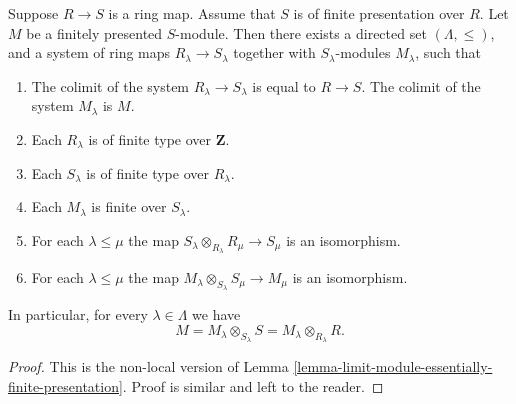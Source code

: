 \begin{lemma}
\label{lemma-limit-module-finite-presentation}
Suppose $R \to S$ is a ring map.
Assume that $S$ is of finite presentation over $R$.
Let $M$ be a finitely presented $S$-module.
Then there exists a directed set $(\Lambda, \leq)$, and
a system of ring maps $R_\lambda \to S_\lambda$
together with $S_\lambda$-modules $M_\lambda$,
such that
\begin{enumerate}
\item The colimit of the system $R_\lambda \to S_\lambda$
is equal to $R \to S$. The colimit of the system $M_\lambda$
is $M$.
\item Each $R_\lambda$ is of finite type
over $\mathbf{Z}$.
\item Each $S_\lambda$ is of finite type
over $R_\lambda$.
\item Each $M_\lambda$ is finite over $S_\lambda$.
\item For each $\lambda \leq \mu$ the map
$S_\lambda \otimes_{R_\lambda} R_\mu \to S_\mu$
is an isomorphism.
\item For each $\lambda \leq \mu$ the map
$M_\lambda \otimes_{S_\lambda} S_\mu \to M_\mu$
is an isomorphism.
\end{enumerate}
In particular, for every $\lambda \in \Lambda$ we have
$$
M = M_\lambda \otimes_{S_\lambda} S
= M_\lambda \otimes_{R_\lambda} R.
$$
\end{lemma}

\begin{proof}
This is the non-local version of
Lemma \ref{lemma-limit-module-essentially-finite-presentation}.
Proof is similar and left to the reader.
\end{proof}














